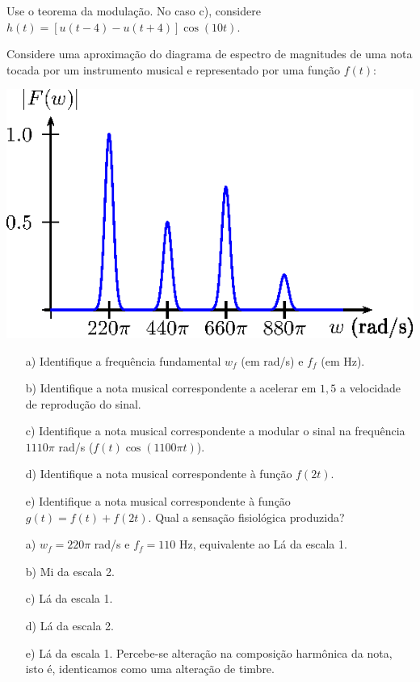 \begin{resp}
 Use o teorema da modulação. No caso c), considere $h(t)=\left[u(t-4)-u(t+4)\right]\cos(10t)$.
\end{resp}
\begin{exer} Considere uma aproximação do diagrama de espectro de magnitudes de uma nota tocada por um instrumento musical e representado por uma função $f(t)$:
\begin{center}
\includegraphics{cap_propriedades_transformada/pics/figura_24}\end{center}
\begin{itemize}
 \item[a)] Identifique a frequência fundamental $w_f$ (em rad/s) e $f_f$ (em Hz).
 \item[b)] Identifique a nota musical correspondente a acelerar em $1,5$ a velocidade de reprodução do sinal.
 \item[c)] Identifique a nota musical correspondente a modular o sinal na frequência $1110\pi$ rad/s ($f(t)\cos(1100\pi t)$).
 \item[d)] Identifique a nota musical correspondente à função $f(2t)$.
 \item[e)] Identifique a nota musical correspondente à função $g(t)=f(t)+f(2t)$. Qual a sensação fisiológica produzida?
 \end{itemize}
\end{exer}
\begin{resp}
\begin{itemize}
 \item[a)] $w_f=220\pi$ rad/s e $f_f=110$ Hz, equivalente ao Lá da escala 1.
 \item[b)] Mi da escala 2.
 \item[c)] Lá da escala 1.
 \item[d)] Lá da escala 2.
 \item[e)] Lá da escala 1. Percebe-se alteração na composição harmônica da nota, isto é, identicamos como uma alteração de timbre.
 \end{itemize}
\end{resp}


